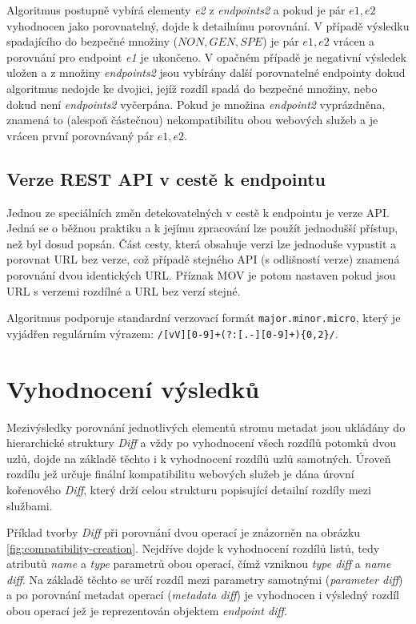 \documentclass[czech,DP]{thesiskiv}
\begin{document}
Algoritmus postupně vybírá elementy \textit{e2} z \textit{endpoints2} a pokud je pár $e1,e2$ vyhodnocen jako porovnatelný, dojde k detailnímu porovnání. V případě výsledku spadajícího do bezpečné množiny (${NON, GEN, SPE}$) je pár $e1,e2$ vrácen a porovnání pro endpoint \textit{e1} je ukončeno. V opačném případě je negativní výsledek uložen a z množiny \textit{endpoints2} jsou vybírány další porovnatelné endpointy dokud algoritmus nedojde ke dvojici, jejíž rozdíl spadá do bezpečné množiny, nebo dokud není \textit{endpoints2} vyčerpána. Pokud je množina \textit{endpoint2} vyprázdněna, znamená to (alespoň částečnou) nekompatibilitu obou webových služeb a je vrácen první porovnávaný pár $e1,e2$.

\subsection{Verze REST API v cestě k endpointu}	
\label{sec:api-path-version}

Jednou ze speciálních změn detekovatelných v cestě k endpointu je verze API. Jedná se o běžnou praktiku \cite{restApiVersion} a k jejímu zpracování lze použít jednodušší přístup, než byl dosud popsán. Část cesty, která obsahuje verzi lze jednoduše vypustit a porovnat URL bez verze, což případě stejného API (s odlišností verze) znamená porovnání dvou identických URL. Příznak MOV je potom nastaven pokud jsou URL s verzemi rozdílné a URL bez verzí stejné.

Algoritmus podporuje standardní verzovací formát \verb|major.minor.micro|, který je vyjádřen regulárním výrazem: \verb|/[vV][0-9]+(?:[.-][0-9]+){0,2}/|.

\section{Vyhodnocení výsledků}

Mezivýsledky porovnání jednotlivých elementů stromu metadat jsou ukládány do hierarchické struktury \textit{Diff} a vždy po vyhodnocení všech rozdílů potomků dvou uzlů, dojde na základě těchto i k vyhodnocení rozdílů uzlů samotných. Úroveň rozdílu jež určuje finální kompatibilitu webových služeb je dána úrovní kořenového \textit{Diff}, který drží celou strukturu popisující detailní rozdíly mezi službami. 

Příklad tvorby \textit{Diff} při porovnání dvou operací je znázorněn na obrázku \ref{fig:compatibility-creation}. Nejdříve dojde k vyhodnocení rozdílů listů, tedy atributů \textit{name} a \textit{type} parametrů obou operací, čímž vzniknou \textit{type diff} a \textit{name diff}. Na základě těchto se určí rozdíl mezi parametry samotnými (\textit{parameter diff}) a po porovnání metadat operací (\textit{metadata diff}) je vyhodnocen i výsledný rozdíl obou operací jež je reprezentován objektem \textit{endpoint diff}.
\end{document}
